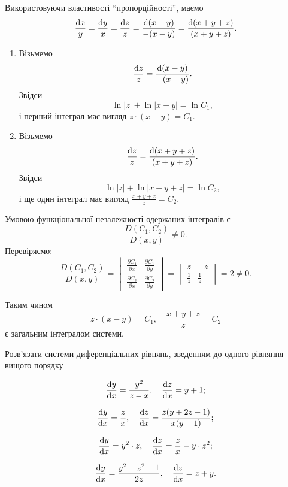 \begin{solution}
	Використовуючи властивості ``пропорційності'', маємо \[ \frac{\mathop{}\!\mathrm{d} x}{y} = \frac{\mathop{}\!\mathrm{d} y}{x} = \frac{\mathop{}\!\mathrm{d} z}{z} = \frac{\mathop{}\!\mathrm{d} (x - y)}{-(x - y)} = \frac{\mathop{}\!\mathrm{d} (x + y + z)}{(x + y + z)}. \]

	\begin{enumerate}
		\item Візьмемо \[\frac{\mathop{}\!\mathrm{d} z}{z} = \frac{\mathop{}\!\mathrm{d} (x - y)}{-(x - y)}.\] Звідси \[\ln |z| + \ln |x - y| = \ln C_1,\] і перший інтеграл має вигляд $z \cdot (x - y) = C_1$.
		\item Візьмемо \[\frac{\mathop{}\!\mathrm{d} z}{z} = \frac{\mathop{}\!\mathrm{d} (x + y + z)}{(x + y + z)}.\] Звідси \[\ln |z| + \ln |x + y + z| = \ln C_2,\] і ще один інтеграл має вигляд $\frac{x + y + z}{z} = C_2$.
	\end{enumerate}

	Умовою функціональної незалежності одержаних інтегралів є \[\frac{D(C_1, C_2)}{D(x, y)} \ne 0.\] Перевіряємо: \[ \frac{D(C_1, C_2)}{D(x, y)} = \begin{vmatrix} \frac{\partial C_1}{\partial x} & \frac{\partial C_1}{\partial y} \\ \frac{\partial C_2}{\partial x} & \frac{\partial C_2}{\partial y} \end{vmatrix} = \begin{vmatrix} z & -z \\ \frac{1}{z} & \frac{1}{z} \end{vmatrix} = 2 \ne 0. \]
	
	Таким чином \[ z \cdot (x - y) = C_1, \quad \frac{x + y + z}{z} = C_2 \] є загальним інтегралом системи.
\end{solution}

Розв'язати системи диференціальних рівнянь, зведенням до одного рівняння вищого порядку

\begin{multicols}{2}
\begin{problem}
	\[ \frac{\mathop{}\!\mathrm{d} y}{\mathop{}\!\mathrm{d} x} = \frac{y^2}{z - x}, \quad \frac{\mathop{}\!\mathrm{d} z}{\mathop{}\!\mathrm{d} x} = y + 1; \]
\end{problem}
\begin{problem}
	\[ \frac{\mathop{}\!\mathrm{d} y}{\mathop{}\!\mathrm{d} x} = \frac{z}{x}, \quad \frac{\mathop{}\!\mathrm{d} z}{\mathop{}\!\mathrm{d} x} = \frac{z (y + 2 z - 1)}{x (y - 1)}; \]
\end{problem}
\begin{problem}
	\[ \frac{\mathop{}\!\mathrm{d} y}{\mathop{}\!\mathrm{d} x} = y^2 \cdot z, \quad \frac{\mathop{}\!\mathrm{d} z}{\mathop{}\!\mathrm{d} x} = \frac{z}{x} - y \cdot z^2; \]
\end{problem}
\begin{problem}
	\[ \frac{\mathop{}\!\mathrm{d} y}{\mathop{}\!\mathrm{d} x} = \frac{y^2 - z^2 + 1}{2 z}, \quad \frac{\mathop{}\!\mathrm{d} z}{\mathop{}\!\mathrm{d} x} = z + y. \]
\end{problem}
\end{multicols}

